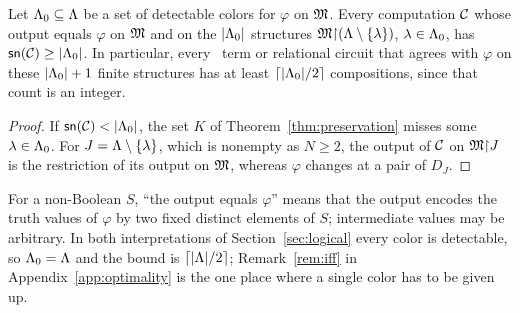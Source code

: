\begin{corollary}\label{cor:detectable}
Let $\Lambda_0\subseteq\Lambda$ be a set of detectable colors for $\varphi$ on $\mathfrak M$.
Every computation $\mathcal C$ whose output equals $\varphi$ on $\mathfrak M$ and on the
$|\Lambda_0|$ structures $\mathfrak M\mathord{\restriction}(\Lambda\setminus\{\lambda\})$, $\lambda\in\Lambda_0$,
has $\mathsf{sn}(\mathcal C)\ge|\Lambda_0|$. In particular, every \CoR\ term or relational
circuit that agrees with $\varphi$ on these $|\Lambda_0|+1$ finite structures has
at least $\lceil|\Lambda_0|/2\rceil$ compositions, since that count is an integer.
\end{corollary}
\begin{proof}
If $\wid{\Comp}<|\Det|$, the set $K$ of Theorem~\ref{thm:preservation}
misses some $\lambda\in\Lambda_0$. For $J=\Lambda\setminus\{\lambda\}$, which is
nonempty as $N\ge2$, the output of $\mathcal C$ on $\mathfrak M\mathord{\restriction} J$ is the restriction
of its output on $\mathfrak M$, whereas $\varphi$ changes at a pair of $D_J$.
\end{proof}
For a non-Boolean $S$, ``the output equals $\varphi$'' means that the output
encodes the truth values of $\varphi$ by two fixed distinct elements of $S$;
intermediate values may be arbitrary. In both interpretations of
Section~\ref{sec:logical} every color is detectable, so $\Lambda_0=\Lambda$ and the
bound is $\lceil|\Lambda|/2\rceil$; Remark~\ref{rem:iff} in
Appendix~\ref{app:optimality} is the one place where a single color has to
be given up.
